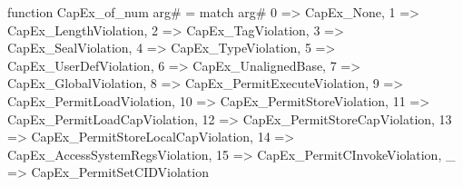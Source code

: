 function CapEx_of_num arg# = match arg# {
  0 => CapEx_None,
  1 => CapEx_LengthViolation,
  2 => CapEx_TagViolation,
  3 => CapEx_SealViolation,
  4 => CapEx_TypeViolation,
  5 => CapEx_UserDefViolation,
  6 => CapEx_UnalignedBase,
  7 => CapEx_GlobalViolation,
  8 => CapEx_PermitExecuteViolation,
  9 => CapEx_PermitLoadViolation,
  10 => CapEx_PermitStoreViolation,
  11 => CapEx_PermitLoadCapViolation,
  12 => CapEx_PermitStoreCapViolation,
  13 => CapEx_PermitStoreLocalCapViolation,
  14 => CapEx_AccessSystemRegsViolation,
  15 => CapEx_PermitCInvokeViolation,
  _ => CapEx_PermitSetCIDViolation
}
